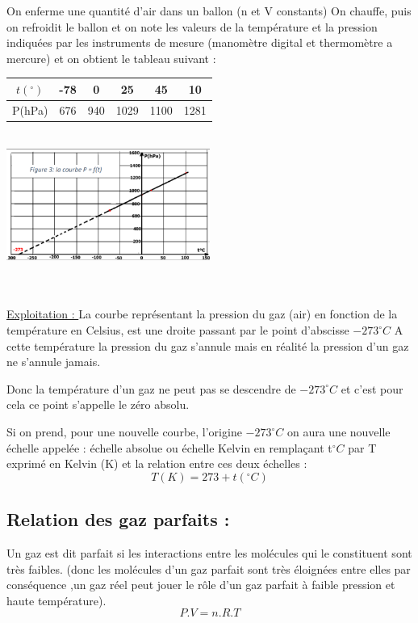 \documentclass[12pt]{article}
\begin{document}
On enferme une quantité d’air dans un ballon (n et V constants) On chauffe, puis on refroidit le
ballon et on note les valeurs de la température et la pression indiquées par les instruments de
mesure (manomètre digital et thermomètre a mercure) et on obtient le tableau suivant :
\begin{table}[h]
    \centering
\begin{tabular}{|c|c|c|c|c|c|}
    \hline
    $t(^{\circ})$ & -78 & 0   & 25   & 45   & 10\\\hline
    P(hPa)        & 676 & 940 & 1029 & 1100 & 1281\\\hline
\end{tabular}
\\\includegraphics[width=0.5\textwidth]{./img/img02.png}
\end{table}\\
\\\underline{Exploitation : }
La courbe représentant la pression du gaz (air) en fonction de la température en Celsius, est
une droite passant par le point d’abscisse $-273^{\circ}C$ A cette température la pression du gaz s’annule mais en réalité la pression d’un gaz ne s’annule jamais.

Donc la température d’un gaz ne peut pas se descendre de $-273^{\circ}C$ et c’est pour cela ce point
s’appelle le zéro absolu.


Si on prend, pour une nouvelle courbe, l’origine $-273^{\circ}C$ on aura une nouvelle échelle appelée :
échelle absolue ou échelle Kelvin en remplaçant t$^{\circ}C$ par T exprimé en Kelvin (K) et la relation
entre ces deux échelles : $$T(K) = 273 +t(^{\circ}C)$$


\subsection{Relation des gaz parfaits : }
Un gaz est dit parfait si les interactions entre les molécules qui le constituent sont très faibles.
(donc les molécules d'un gaz parfait sont très éloignées entre elles par conséquence ,un gaz réel peut jouer le rôle
d'un gaz parfait à faible pression et haute température). $$P.V = n.R.T$$
\end{document}
